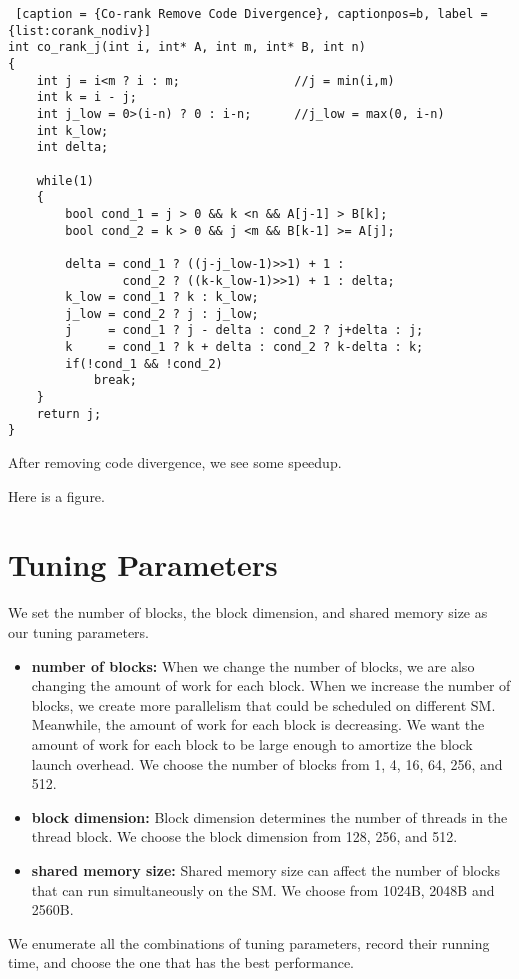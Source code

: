         \begin{minipage}{\linewidth}
        \begin{singlespace}
        \begin{lstlisting} [caption = {Co-rank Remove Code Divergence}, captionpos=b, label = {list:corank_nodiv}]
int co_rank_j(int i, int* A, int m, int* B, int n)
{
    int j = i<m ? i : m;                //j = min(i,m)
    int k = i - j;
    int j_low = 0>(i-n) ? 0 : i-n;      //j_low = max(0, i-n) 
    int k_low;
    int delta;

    while(1)
    {
        bool cond_1 = j > 0 && k <n && A[j-1] > B[k];
        bool cond_2 = k > 0 && j <m && B[k-1] >= A[j];
        
        delta = cond_1 ? ((j-j_low-1)>>1) + 1 : 
                cond_2 ? ((k-k_low-1)>>1) + 1 : delta;
        k_low = cond_1 ? k : k_low;
        j_low = cond_2 ? j : j_low;
        j     = cond_1 ? j - delta : cond_2 ? j+delta : j;
        k     = cond_1 ? k + delta : cond_2 ? k-delta : k;
        if(!cond_1 && !cond_2)
            break;
    }
    return j;
}
        \end{lstlisting}
        \end{singlespace}
        \end{minipage}

        After removing code divergence, we see some speedup.

        Here is a figure.

    \section{Tuning Parameters}\label{sect:tuning}
    We set the number of blocks, the block dimension, and shared memory size as our tuning
    parameters.
    \begin{itemize}
    \item \textbf{number of blocks:} When we change the number of blocks, we are also changing
           the amount of work for each block. When we increase the number of blocks, we create 
           more parallelism that could be scheduled on different SM. Meanwhile, the amount of 
           work for each block is decreasing. We want the amount of work for each block to be
           large enough to amortize the block launch overhead. We choose the number of blocks 
           from 1, 4, 16, 64, 256, and 512.
    \item \textbf{block dimension:} Block dimension determines the number of threads in the 
           thread block. We choose the block dimension from 128, 256, and 512.
    \item \textbf{shared memory size:} Shared memory size can affect the number of blocks that
          can run simultaneously on the SM. We choose from 1024B, 2048B and 2560B. 
    \end{itemize}

    We enumerate all the combinations of tuning parameters, record their running time, and 
    choose the one that has the best performance.


